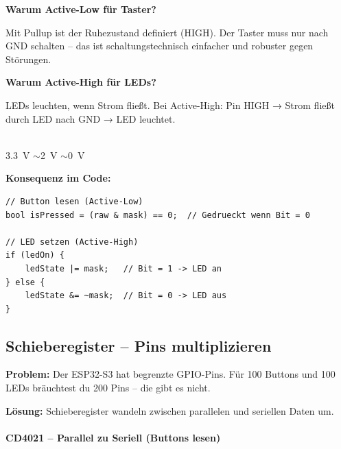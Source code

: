 \textbf{Warum Active-Low für Taster?}

Mit Pullup ist der Ruhezustand definiert (HIGH). Der Taster muss nur nach GND schalten – das ist schaltungstechnisch einfacher und robuster gegen Störungen.

\textbf{Warum Active-High für LEDs?}

LEDs leuchten, wenn Strom fließt. Bei Active-High: Pin HIGH → Strom fließt durch LED nach GND → LED leuchtet.

\begin{center}
\\[0.5em]
\footnotesize\color{MutedText} \SI{3,3}{\volt} \hspace{1.5cm} $\sim$\SI{2}{\volt} \hspace{1cm} $\sim$\SI{0}{\volt}
\end{center}

\textbf{Konsequenz im Code:}

\begin{lstlisting}[style=arduino]
// Button lesen (Active-Low)
bool isPressed = (raw & mask) == 0;  // Gedrueckt wenn Bit = 0

// LED setzen (Active-High)
if (ledOn) {
    ledState |= mask;   // Bit = 1 -> LED an
} else {
    ledState &= ~mask;  // Bit = 0 -> LED aus
}
\end{lstlisting}

\subsection{Schieberegister – Pins multiplizieren}

\textbf{Problem:} Der ESP32-S3 hat begrenzte GPIO-Pins. Für 100 Buttons und 100 LEDs bräuchtest du 200 Pins – die gibt es nicht.

\textbf{Lösung:} Schieberegister wandeln zwischen parallelen und seriellen Daten um.

\paragraph{CD4021 – Parallel zu Seriell (Buttons lesen)}

